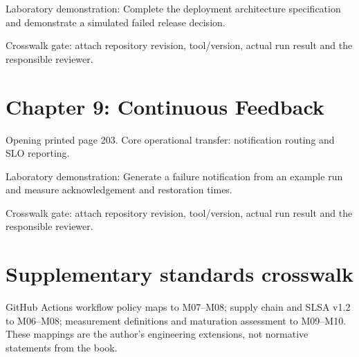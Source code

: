 \documentclass[11pt,letterpaper]{article}
\begin{document}
Laboratory demonstration: Complete the deployment architecture specification and demonstrate a simulated failed release decision.

Crosswalk gate: attach repository revision, tool/version, actual run result and the responsible reviewer.

\section{Chapter 9: Continuous Feedback}
Opening printed page 203. Core operational transfer: notification routing and SLO reporting.

Laboratory demonstration: Generate a failure notification from an example run and measure acknowledgement and restoration times.

Crosswalk gate: attach repository revision, tool/version, actual run result and the responsible reviewer.

\section{Supplementary standards crosswalk}
GitHub Actions workflow policy maps to M07--M08; supply chain and SLSA v1.2 to M06--M08; measurement definitions and maturation assessment to M09--M10. These mappings are the author's engineering extensions, not normative statements from the book.
\end{document}
